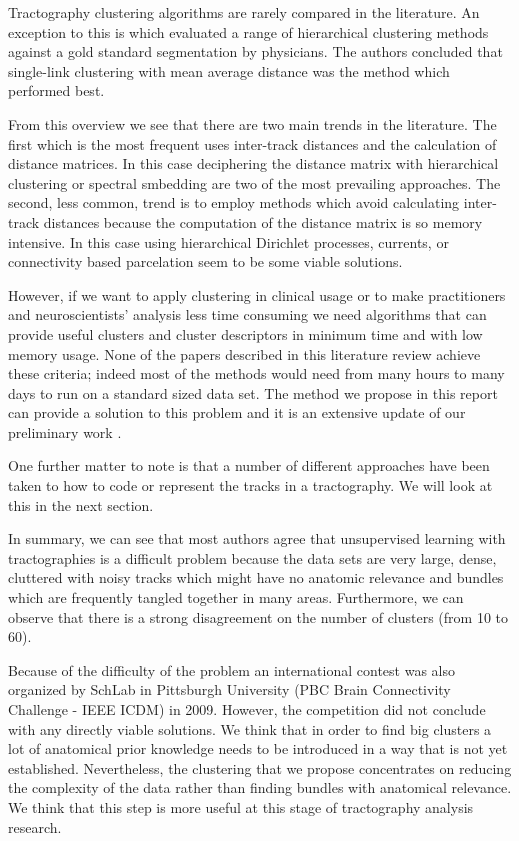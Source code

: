 \documentclass[preprint,authoryear,a4paper,10pt,onecolumn]{elsarticle}
\begin{document}
Tractography clustering algorithms are rarely compared in the
literature. An exception to this is \citep{moberts2005evaluation} which
evaluated a range of hierarchical clustering methods against a gold
standard segmentation by physicians. The authors concluded that
single-link clustering with mean average distance was the method which
performed best.

From this overview we see that there are two main trends in the
literature. The first which is the most frequent uses inter-track
distances and the calculation of distance matrices. In this case
deciphering the distance matrix with hierarchical clustering or spectral
smbedding are two of the most prevailing approaches. The second, less
common, trend is to employ methods which avoid calculating inter-track
distances because the computation of the distance matrix is so memory
intensive. In this case using hierarchical Dirichlet processes,
currents, or connectivity based parcelation seem to be some viable
solutions.

However, if we want to apply clustering in clinical usage or to make
practitioners and neuroscientists' analysis less time consuming we need
algorithms that can provide useful clusters and cluster descriptors in
minimum time and with low memory usage. None of the papers described in
this literature review achieve these criteria; indeed most of the
methods would need from many hours to many days to run on a standard
sized data set. The method we propose in this report can provide a
solution to this problem and it is an extensive update of our
preliminary work \citet{EGMB10}.

One further matter to note is that a number of different approaches have
been taken to how to code or represent the tracks in a tractography. We
will look at this in the next section.

In summary, we can see that most authors agree that unsupervised
learning with tractographies is a difficult problem because the data
sets are very large, dense, cluttered with noisy tracks which might have
no anatomic relevance and bundles which are frequently tangled together
in many areas. Furthermore, we can observe that there is a strong
disagreement on the number of clusters (from 10 to 60).

Because of the difficulty of the problem an international contest was
also organized by SchLab in Pittsburgh University (PBC Brain
Connectivity Challenge - IEEE ICDM) in 2009. However, the competition
did not conclude with any directly viable solutions. We think that in order
to find big clusters a lot of anatomical prior knowledge needs to be
introduced in a way that is not yet established. Nevertheless, the
clustering that we propose concentrates on reducing the complexity of
the data rather than finding bundles with anatomical relevance. We think
that this step is more useful at this stage of tractography analysis
research.
\end{document}
